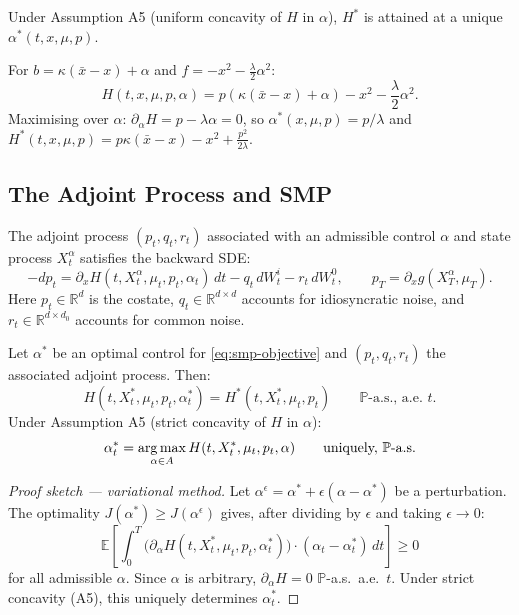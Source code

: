 Under Assumption A5 (uniform concavity of $H$ in $\alpha$), $H^*$ is attained at a
unique $\alpha^*(t,x,\mu,p)$.

\begin{example}
\label{ex:mp-lq-hamiltonian}
For $b = \kappa(\bar{x}-x) + \alpha$ and $f = -x^2 - \tfrac{\lambda}{2}\alpha^2$:
\[
    H(t,x,\mu,p,\alpha) = p(\kappa(\bar{x}-x) + \alpha) - x^2 - \frac{\lambda}{2}
    \alpha^2.
\]
Maximising over $\alpha$: $\partial_\alpha H = p - \lambda\alpha = 0$, so
$\alpha^*(x,\mu,p) = p/\lambda$ and $H^*(t,x,\mu,p) = p\kappa(\bar{x}-x) - x^2 +
\frac{p^2}{2\lambda}$.
\end{example}

\subsection{The Adjoint Process and SMP}

\begin{definition}
The adjoint process $(p_t, q_t, r_t)$ associated with an admissible control $\alpha$
and state process $X_t^\alpha$ satisfies the backward SDE:
\begin{equation}
    -dp_t = \partial_x H(t, X_t^\alpha, \mu_t, p_t, \alpha_t)\, dt - q_t\, dW_t^i -
    r_t\, dW_t^0, \qquad p_T = \partial_x g(X_T^\alpha, \mu_T).
    \label{eq:smp-adjoint-bsde}
\end{equation}
Here $p_t \in \mathbb{R}^d$ is the costate, $q_t \in \mathbb{R}^{d \times d}$ accounts
for idiosyncratic noise, and $r_t \in \mathbb{R}^{d \times d_0}$ accounts for common
noise.
\end{definition}

\begin{theorem}
\label{thm:smp}
Let $\alpha^*$ be an optimal control for \eqref{eq:smp-objective} and $(p_t,q_t,r_t)$
the associated adjoint process. Then:
\[
    H(t, X_t^*, \mu_t, p_t, \alpha_t^*) = H^*(t, X_t^*, \mu_t, p_t) \qquad
    \mathbb{P}\text{-a.s., a.e.\ } t.
\]
Under Assumption A5 (strict concavity of $H$ in $\alpha$):
\[
    \alpha_t^* = \operatorname*{arg\,max}_{\alpha \in A} H(t, X_t^*, \mu_t, p_t, \alpha) \qquad
    \text{uniquely, } \mathbb{P}\text{-a.s.}
\]
\end{theorem}

\begin{proof}[Proof sketch --- variational method]
Let $\alpha^\epsilon = \alpha^* + \epsilon(\alpha - \alpha^*)$ be a perturbation. The
optimality $J(\alpha^*) \geq J(\alpha^\epsilon)$ gives, after dividing by $\epsilon$ and
taking $\epsilon \to 0$:
\[
    \mathbb{E}\left[ \int_0^T \big(\partial_\alpha H(t, X_t^*, \mu_t, p_t,
    \alpha_t^*)\big) \cdot (\alpha_t - \alpha_t^*)\, dt \right] \geq 0
\]
for all admissible $\alpha$. Since $\alpha$ is arbitrary, $\partial_\alpha H = 0$
$\mathbb{P}$-a.s.\ a.e.\ $t$. Under strict concavity (A5), this uniquely determines
$\alpha_t^*$.
\end{proof}


